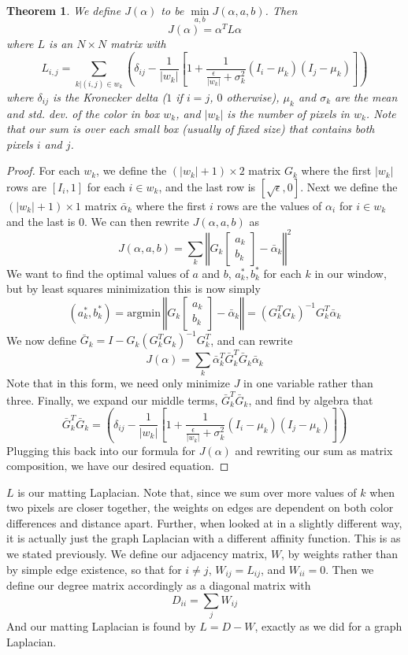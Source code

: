\newtheorem{matlapthm}{Theorem}
\begin{matlapthm}
We define $J(\alpha)$ to be $\min\limits_{a,b} J(\alpha,a,b)$. Then
\[J(\alpha)=\alpha^{T}L\alpha\]
where $L$ is an $N\times N$ matrix with
\[L_{i,j}=\sum_{k|(i,j)\in w_k}\left(
	\delta_{ij}-\frac{1}{|w_k|}\left[
	1+\frac{1}{\frac{\epsilon}{|w_k|}+\sigma_k^2}
	(I_i-\mu_k)(I_j-\mu_k)
\right]\right)\]
where $\delta_{ij}$ is the Kronecker delta ($1$ if $i=j$, $0$ otherwise), $\mu_k$ and $\sigma_k$ are the mean and std. dev. of the color in box $w_k$, and $|w_k|$ is the number of pixels in $w_k$. Note that our sum is over each small box (usually of fixed size) that contains both pixels $i$ and $j$.
\end{matlapthm}
\begin{proof}
For each $w_k$, we define the $(|w_k|+1)\times2$ matrix $G_k$ where the first $|w_k|$ rows are $[I_i,1]$ for each $i\in w_k$, and the last row is $[\sqrt{\epsilon},0]$. Next we define the $(|w_k|+1)\times1$ matrix $\bar{\alpha}_k$ where the first $i$ rows are the values of $\alpha_i$ for $i\in w_k$ and the last is $0$. We can then rewrite $J(\alpha,a,b)$ as
\[J(\alpha,a,b)=\sum_k\left\Vert
G_k\left[\begin{array}{cc}
a_k \\ b_k
\end{array}\right]
 - \bar{\alpha}_k
\right\Vert^2\]
We want to find the optimal values of $a$ and $b$, $a_k^{*},b_k^{*}$ for each $k$ in our window, but by least squares minimization this is now simply
\[(a_k^*,b_k^*)=\text{argmin}\,
\left\Vert
G_k\left[\begin{array}{cc}
a_k \\ b_k
\end{array}\right]
 - \bar{\alpha}_k
\right\Vert=(G_k^{T}G_k)^{-1}G_k^{T}\bar{\alpha}_k\]
We now define $\bar{G}_k=I-G_k(G_k^TG_k)^{-1}G_k^T$, and can rewrite
\[J(\alpha)=
	\sum_k\bar{\alpha}_k^T\bar{G}_k^T
	      \bar{G}_k\bar{\alpha}_k\]
Note that in this form, we need only minimize $J$ in one variable rather than three. Finally, we expand our middle terms, $\bar{G}_k^T \bar{G}_k$, and find by algebra that
\[\bar{G}_k^T \bar{G}_k=\left(
	\delta_{ij}-\frac{1}{|w_k|}\left[
	1+\frac{1}{\frac{\epsilon}{|w_k|}+\sigma_k^2}
	(I_i-\mu_k)(I_j-\mu_k)
\right]\right)\]
Plugging this back into our formula for $J(\alpha)$ and rewriting our sum as matrix composition, we have our desired equation.
\end{proof}
$L$ is our matting Laplacian. Note that, since we sum over more values of $k$ when two pixels are closer together, the weights on edges are dependent on both color differences and distance apart. Further, when looked at in a slightly different way, it is actually just the graph Laplacian with a different affinity function. This is as we stated previously. We define our adjacency matrix, $W$, by weights rather than by simple edge existence, so that for $i\neq j$, $W_{ij}=L_{ij}$, and $W_{ii}=0$. Then we define our degree matrix accordingly as a diagonal matrix with
\[D_{ii}=\sum_j W_{ij}\]
And our matting Laplacian is found by $L=D-W$, exactly as we did for a graph Laplacian.
